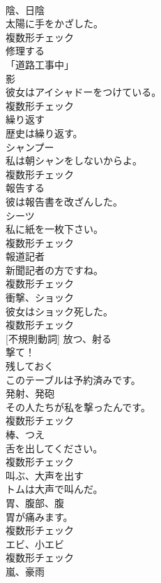 \documentclass[8pt]{extreport}
\begin{document}
\begin{CJK}{UTF8}{min}
\\	[名詞]	陰、日陰	
\\	太陽に手をかざした。	
\\	複数形チェック
\\	[動詞]	修理する	
\\	「道路工事中」	
\\	[名詞]	影	
\\	彼女はアイシャドーをつけている。	
\\	複数形チェック
\\	[動詞]	繰り返す	
\\	歴史は繰り返す。	
\\	[名詞]	シャンプー	
\\	私は朝シャンをしないからよ。	
\\	複数形チェック
\\	[動詞]	報告する	
\\	彼は報告書を改ざんした。	
\\	[名詞]	シーツ	
\\	私に紙を一枚下さい。	
\\	複数形チェック
\\	[名詞]	報道記者	
\\	新聞記者の方ですね。	
\\	複数形チェック
\\	[名詞]	衝撃、ショック	
\\	彼女はショック死した。	
\\	複数形チェック
\\	[動詞] [不規則動詞]	放つ、射る	
\\	撃て！	
\\	[動詞]	残しておく	
\\	このテーブルは予約済みです。	
\\	[名詞]	発射、発砲	
\\	その人たちが私を撃ったんです。	
\\	複数形チェック
\\	[名詞]	棒、つえ	
\\	舌を出してください。	
\\	複数形チェック
\\	[動詞]	叫ぶ、大声を出す	
\\	トムは大声で叫んだ。	
\\	[名詞]	胃、腹部、腹	
\\	胃が痛みます。	
\\	複数形チェック
\\	[名詞]	エビ、小エビ	
\\	複数形チェック
\\	[名詞]	嵐、豪雨	

\end{CJK}
\end{document}
